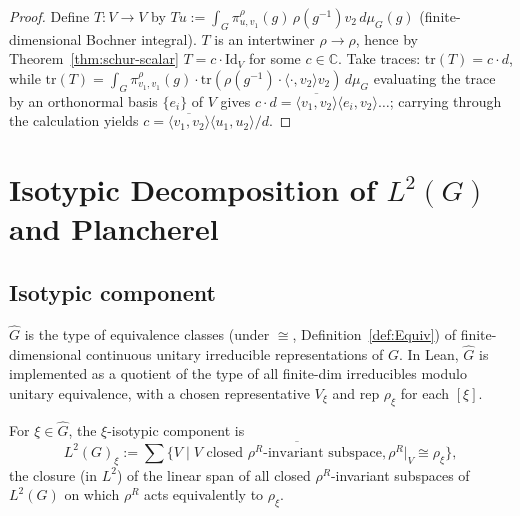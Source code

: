 \begin{proof}
  Define $T : V \to V$ by
  $T u := \int_G \pi_{u, v_1}^\rho(g)\, \rho(g^{-1}) v_2\, d\mu_G(g)$
  (finite-dimensional Bochner integral). $T$ is an intertwiner
  $\rho \to \rho$, hence by Theorem~\ref{thm:schur-scalar}
  $T = c \cdot \mathrm{Id}_V$ for some $c \in \mathbb C$.
  Take traces: $\mathrm{tr}(T) = c \cdot d$, while
  $\mathrm{tr}(T) = \int_G \pi_{v_1, v_1}^\rho(g) \cdot \mathrm{tr}(\rho(g^{-1}) \cdot \langle\cdot, v_2\rangle v_2)\,d\mu_G$
  evaluating the trace by an orthonormal basis $\{e_i\}$ of $V$ gives
  $c \cdot d = \overline{\langle v_1, v_2\rangle}\langle e_i, v_2\rangle\dots$;
  carrying through the calculation yields
  $c = \overline{\langle v_1, v_2\rangle}\langle u_1, u_2\rangle / d$.
\end{proof}


\chapter{Isotypic Decomposition of $L^2(G)$ and Plancherel}
\label{chap:isotypic}

\section{Isotypic component}

\begin{definition}
  \label{def:Ghat}
  \leanok
  $\widehat G$ is the type of equivalence classes (under $\cong$,
  Definition~\ref{def:Equiv}) of finite-dimensional continuous unitary
  irreducible representations of $G$.
  In Lean, $\widehat G$ is implemented as a quotient of the type of all
  finite-dim irreducibles modulo unitary equivalence, with a chosen
  representative $V_\xi$ and rep $\rho_\xi$ for each $[\xi]$.
\end{definition}

\begin{definition}
  \label{def:isotypic}
  \leanok
  For $\xi \in \widehat G$, the $\xi$-isotypic component is
  \[
     L^2(G)_\xi :=
     \overline{\sum \{V \mid V \text{ closed $\rho^R$-invariant subspace}, \rho^R|_V \cong \rho_\xi\}},
  \]
  the closure (in $L^2$) of the linear span of all closed $\rho^R$-invariant
  subspaces of $L^2(G)$ on which $\rho^R$ acts equivalently to $\rho_\xi$.
\end{definition}

